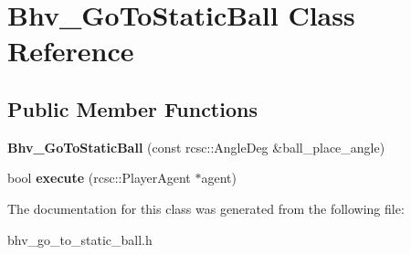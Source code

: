 \hypertarget{classBhv__GoToStaticBall}{
\section{Bhv\_\-GoToStaticBall Class Reference}
\label{classBhv__GoToStaticBall}
}
\subsection*{Public Member Functions}
\begin{DoxyCompactItemize}
\item 
\hypertarget{classBhv__GoToStaticBall_ac7faba2a4cabafeff904ac21baf20d3f}{
{\bfseries Bhv\_\-GoToStaticBall} (const rcsc::AngleDeg \&ball\_\-place\_\-angle)}
\label{classBhv__GoToStaticBall_ac7faba2a4cabafeff904ac21baf20d3f}

\item 
\hypertarget{classBhv__GoToStaticBall_a40d080672381d4cd1f3006295dd5ff13}{
bool {\bfseries execute} (rcsc::PlayerAgent $\ast$agent)}
\label{classBhv__GoToStaticBall_a40d080672381d4cd1f3006295dd5ff13}

\end{DoxyCompactItemize}


The documentation for this class was generated from the following file:\begin{DoxyCompactItemize}
\item 
bhv\_\-go\_\-to\_\-static\_\-ball.h\end{DoxyCompactItemize}
